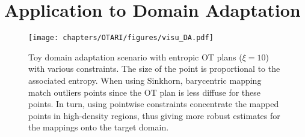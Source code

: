 \section{Application to Domain Adaptation}

\begin{figure}[h]
  \begin{center}
  \centerline{\texttt{[image: chapters/OTARI/figures/visu\_DA.pdf]}}
  \caption{Toy domain adaptation scenario with entropic OT plans ($\xi=10$) with various constraints. The size of the point is proportional to the associated entropy. When using Sinkhorn, barycentric mapping match outliers points since the OT plan is less diffuse for these points. In turn, using pointwise constraints concentrate the 
   mapped points in high-density regions, thus giving more robust estimates for the mappings onto the target domain.}
  \label{fig:visu_DA}
  \end{center}
\end{figure}


